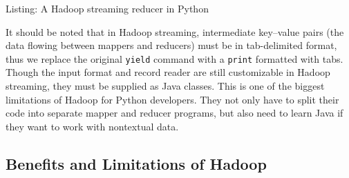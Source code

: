 \documentclass[]{krantz}
\begin{document}
Listing: A Hadoop streaming reducer in Python

It should be noted that in Hadoop streaming, intermediate key--value
pairs (the data flowing between mappers and reducers) must be in
tab-delimited format, thus we replace the original \texttt{yield}
command with a \texttt{print} formatted with tabs. Though the input
format and record reader are still customizable in Hadoop streaming,
they must be supplied as Java classes. This is one of the biggest
limitations of Hadoop for Python developers. They not only have to split
their code into separate mapper and reducer programs, but also need to
learn Java if they want to work with nontextual data.

\subsection{Benefits and Limitations of
Hadoop}\label{benefits-and-limitations-of-hadoop}
\end{document}
